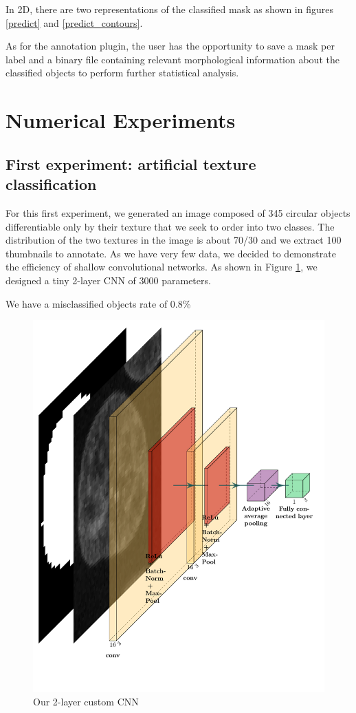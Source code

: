 \documentclass{article}
\begin{document}
In 2D, there are two representations of the classified mask as shown in figures \ref{predict} and \ref{predict_contours}.

As for the annotation plugin, the user has the opportunity to save a mask per label and a binary file containing relevant morphological information about the classified objects to perform further statistical analysis.


\section{Numerical Experiments}
\label{sec:experiments}


\subsection{First experiment: artificial texture classification}

For this first experiment, we generated an image composed of  345 circular objects differentiable only by their texture that we seek to order into two classes. The distribution of the two textures in the image is about 70/30 and we extract 100 thumbnails to annotate. 
As we have very few data, we decided to demonstrate the efficiency of shallow convolutional networks. As shown in Figure \ref{CNN2D}, we designed a tiny 2-layer CNN of 3000 parameters.

We have a misclassified objects rate of 0.8\%


\begin{figure}[h!]{}
 \centering
 \includegraphics[scale=0.35]{Figures/myfirstcnn.pdf}
  \caption{Our 2-layer custom CNN}
  \label{CNN2D}

\end{figure}
\end{document}
